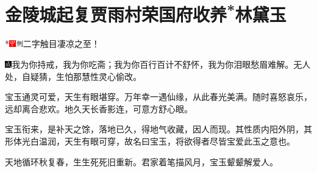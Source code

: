 

\chapter{金陵城起复贾雨村\hspace{.5em}荣国府收养\textsuperscript{*}林黛玉}

*{\includegraphics[width=3mm]{../Images/00002}\includegraphics[width=3mm]{../Images/00011}\footnotesize \kaishu 二字触目凄凉之至！}

{\includegraphics[width=3mm]{../Images/00005}\kaishu  我为你持戒，我为你吃斋；我为你百行百计不舒怀，我为你泪眼愁眉难解。无人处，自疑猜，生怕那慧性灵心偷改。}

{\kaishu 宝玉通灵可爱，天生有眼堪穿。万年幸一遇仙缘，从此春光美满。随时喜怒哀乐，远却离合悲欢。地久天长香影连，可意方舒心眼。}

{\kaishu 宝玉衔来，是补天之馀，落地已久，得地气收藏，因人而现。其性质内阳外阴，其形体光白温润，天生有眼可穿，故名曰宝玉，将欲得者尽皆宝爱此玉之意也。}

{\kaishu 天地循环秋复春，生生死死旧重新。君家着笔描风月，宝玉颦颦解爱人。}

